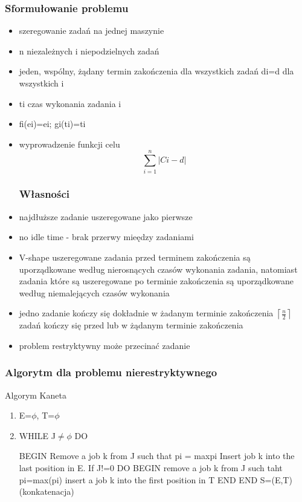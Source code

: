 \documentclass[12pt,a4paper]{article}
\begin{document}
\subsubsection{Sformułowanie problemu}
\begin{itemize}
\item szeregowanie zadań na jednej maszynie
\item n niezależnych i niepodzielnych zadań
\item jeden, wspólny, żądany termin zakończenia dla wszystkich zadań di=d dla wszystkich i
\item ti czas wykonania zadania i
\item fi(ei)=ei; gi(ti)=ti
\item wyprowadzenie funkcji celu
\begin{equation}
\sum\limits_{i=1}^{n}\left | Ci-d \right |
\end{equation}
\subsubsection{Własności}
\item najdłuższe zadanie uszeregowane jako pierwsze
\item no idle time - brak przerwy mieędzy zadaniami
\item V-shape uszeregowane zadania przed terminem zakończenia są uporządkowane według nierosnących czasów wykonania zadania, natomiast zadania które są uszeregowane po terminie zakończenia są uporządkowane według niemalejących czasów wykonania
\item jedno zadanie kończy się dokładnie w żadanym terminie zakończenia $\left \lceil \frac{n}{2} \right \rceil$ zadań kończy się przed lub w żądanym terminie zakończenia
\item problem restryktywny może przecinać zadanie
\end{itemize}
\subsubsection{Algorytm dla problemu nierestryktywnego}
Algorym Kaneta
\begin{enumerate}
\item E=$\phi$, T=$\phi$
\item WHILE J$\neq \phi$ DO

BEGIN
Remove a job k from J such that pi = max{pi}
Insert job k into the last position in E.
If J!=0 DO
BEGIN remove a job k from J such taht pi=max(pi)
insert a job k into the first position in T
END
END
S=(E,T) (konkatenacja)
\end{enumerate}
\end{document}
